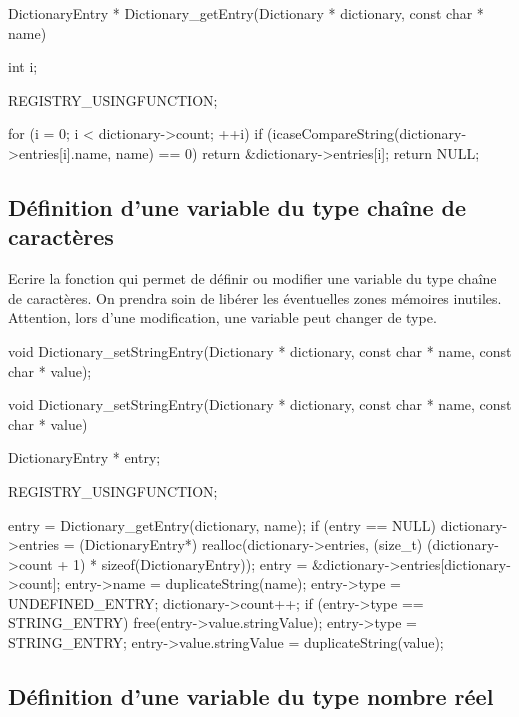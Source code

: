 \begin{csourcecorrection}
DictionaryEntry * Dictionary_getEntry(Dictionary * dictionary, const char * name) {
    int i;

    REGISTRY_USINGFUNCTION;

    for (i = 0; i < dictionary->count; ++i)
        if (icaseCompareString(dictionary->entries[i].name, name) == 0)
            return &dictionary->entries[i];
    return NULL;
}
\end{csourcecorrection}

\subsection{Définition d'une variable du type chaîne de caractères}

Ecrire la fonction  qui permet de définir ou modifier une variable du type chaîne de caractères. On prendra soin de libérer les éventuelles zones mémoires inutiles. Attention, lors d'une modification, une variable peut changer de type.

\begin{csource}
void Dictionary_setStringEntry(Dictionary * dictionary, const char * name, const char * value);
\end{csource}

\begin{csourcecorrection}
void Dictionary_setStringEntry(Dictionary * dictionary, const char * name,
        const char * value) {
    DictionaryEntry * entry;

    REGISTRY_USINGFUNCTION;

    entry = Dictionary_getEntry(dictionary, name);
    if (entry == NULL) {
        dictionary->entries = (DictionaryEntry*) realloc(dictionary->entries,
                (size_t) (dictionary->count + 1) * sizeof(DictionaryEntry));
        entry = &dictionary->entries[dictionary->count];
        entry->name = duplicateString(name);
        entry->type = UNDEFINED_ENTRY;
        dictionary->count++;
    }
    if (entry->type == STRING_ENTRY)
        free(entry->value.stringValue);
    entry->type = STRING_ENTRY;
    entry->value.stringValue = duplicateString(value);
}
\end{csourcecorrection}

\subsection{Définition d'une variable du type nombre réel}

